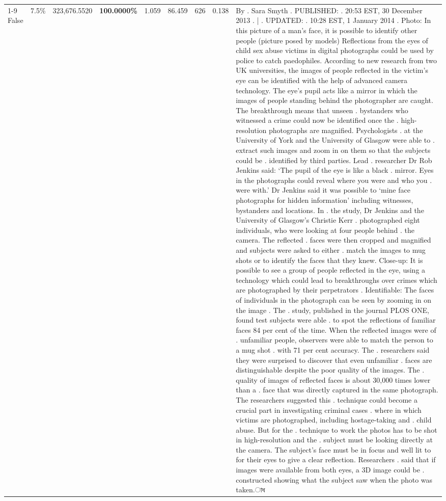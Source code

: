 \begin{table}[H]
\begin{tabular}{lllrlllll}
\cline{1-9} \cline{2-9}
False & 7.5\% & 323,676.5520 & \bfseries \color{red} 100.0000\% & 1.059 & 86.459 & 626 & 0.138 & By . Sara Smyth . PUBLISHED: . 20:53 EST, 30 December 2013 . | . UPDATED: . 10:28 EST, 1 January 2014 . Photo: In this picture of a man's face, it is possible to identify other people (picture posed by models) Reflections from the eyes of child sex abuse victims in digital photographs could be used by police to catch paedophiles. According to new research from two UK universities, the images of people reflected in the victim's eye can be identified with the help of advanced camera technology. The eye's pupil acts like a mirror in which the images of people standing behind the photographer are caught. The breakthrough means that unseen . bystanders who witnessed a crime could now be identified once the . high-resolution photographs are magnified. Psychologists . at the University of York and the University of Glasgow were able to . extract such images and zoom in on them so that the subjects could be . identified by third parties. Lead . researcher Dr Rob Jenkins said: ‘The pupil of the eye is like a black . mirror. Eyes in the photographs could reveal where you were and who you . were with.' Dr Jenkins said it was possible to ‘mine face photographs for hidden information' including witnesses, bystanders and locations. In . the study, Dr Jenkins and the University of Glasgow's Christie Kerr . photographed eight individuals, who were looking at four people behind . the camera. The reflected . faces were then cropped and magnified and subjects were asked to either . match the images to mug shots or to identify the faces that they knew. Close-up: It is possible to see a group of people reflected in the eye, using a technology which could lead to breakthroughs over crimes which are photographed by their perpetrators . Identifiable: The faces of individuals in the photograph can be seen by zooming in on the image . The . study, published in the journal PLOS ONE, found test subjects were able . to spot the reflections of familiar faces 84 per cent of the time. When the reflected images were of . unfamiliar people, observers were able to match the person to a mug shot . with 71 per cent accuracy. The . researchers said they were surprised to discover that even unfamiliar . faces are distinguishable despite the poor quality of the images. The . quality of images of reflected faces is about 30,000 times lower than a . face that was directly captured in the same photograph. The researchers suggested this . technique could become a crucial part in investigating criminal cases . where in which victims are photographed, including hostage-taking and . child abuse. But for the . technique to work the photos has to be shot in high-resolution and the . subject must be looking directly at the camera. The subject's face must be in focus and well lit to for their eyes to give a clear reflection. Researchers . said that if images were available from both eyes, a 3D image could be . constructed showing what the subject saw when the photo was taken.াধ \\

\end{tabular}
\end{table}
